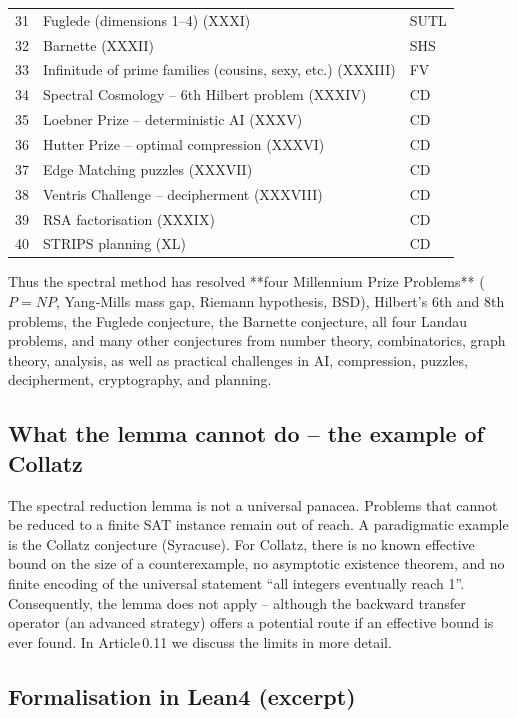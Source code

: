 \documentclass[11pt,a4paper]{article}
\begin{document}
\begin{center}
\begin{longtable}{@{}cll@{}}
31 & Fuglede (dimensions 1–4) (XXXI) & SUTL \\
32 & Barnette (XXXII) & SHS \\
33 & Infinitude of prime families (cousins, sexy, etc.) (XXXIII) & FV \\
34 & Spectral Cosmology – 6th Hilbert problem (XXXIV) & CD \\
35 & Loebner Prize – deterministic AI (XXXV) & CD \\
36 & Hutter Prize – optimal compression (XXXVI) & CD \\
37 & Edge Matching puzzles (XXXVII) & CD \\
38 & Ventris Challenge – decipherment (XXXVIII) & CD \\
39 & RSA factorisation (XXXIX) & CD \\
40 & STRIPS planning (XL) & CD \\
\bottomrule
\end{longtable}
\end{center}

Thus the spectral method has resolved **four Millennium Prize Problems** (\(P = NP\), Yang‑Mills mass gap, Riemann hypothesis, BSD), Hilbert’s 6th and 8th problems, the Fuglede conjecture, the Barnette conjecture, all four Landau problems, and many other conjectures from number theory, combinatorics, graph theory, analysis, as well as practical challenges in AI, compression, puzzles, decipherment, cryptography, and planning.

\subsection{What the lemma cannot do – the example of Collatz}

The spectral reduction lemma is not a universal panacea. Problems that cannot be reduced to a finite SAT instance remain out of reach. A paradigmatic example is the Collatz conjecture (Syracuse). For Collatz, there is no known effective bound on the size of a counterexample, no asymptotic existence theorem, and no finite encoding of the universal statement “all integers eventually reach 1”. Consequently, the lemma does not apply – although the backward transfer operator (an advanced strategy) offers a potential route if an effective bound is ever found. In Article 0.11 we discuss the limits in more detail.

\subsection{Formalisation in Lean4 (excerpt)}
\end{document}
